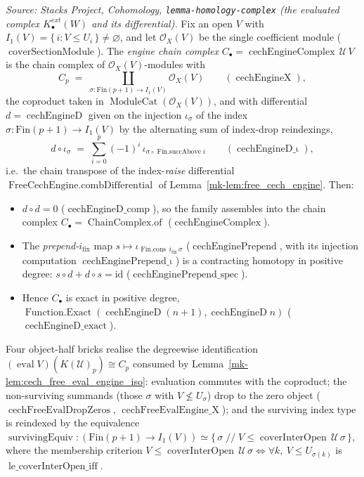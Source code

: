 \begin{lemma}
  \textit{Source: Stacks Project, Cohomology, \texttt{lemma-homology-complex}
  (the evaluated complex \(K^{ext}_\bullet(W)\) and its differential).}
  Fix an open \(V\) with \(I_1(V) = \{\, i : V \leq U_i \,\} \neq \varnothing\), and
  let \(\mathcal{O}_X(V)\) be the single coefficient module
  (\(\operatorname{coverSectionModule}\)). The \emph{engine chain complex}
  \(C_\bullet = \operatorname{cechEngineComplex}\, \mathcal{U}\, V\) is the chain
  complex of \(\mathcal{O}_X(V)\)-modules with
  \[
    C_p \;=\; \coprod_{\sigma : \mathrm{Fin}(p+1) \to I_1(V)} \mathcal{O}_X(V)
    \qquad (\operatorname{cechEngineX}),
  \]
  the coproduct taken in \(\operatorname{ModuleCat}(\mathcal{O}_X(V))\), and with
  differential \(d = \operatorname{cechEngineD}\) given on the injection
  \(\iota_\sigma\) of the index \(\sigma : \mathrm{Fin}(p+1) \to I_1(V)\) by the
  alternating sum of index-drop reindexings,
  \[
    d \circ \iota_\sigma
      \;=\; \sum_{i=0}^{p} (-1)^i\, \iota_{\sigma \circ \operatorname{Fin.succAbove} i}
    \qquad (\operatorname{cechEngineD\_\iota}),
  \]
  i.e.\ the chain transpose of the index-\emph{raise} differential
  \(\operatorname{FreeCechEngine.combDifferential}\) of
  Lemma~\ref{mk-lem:free_cech_engine}. Then:
  \begin{itemize}
    \item \(d \circ d = 0\) (\(\operatorname{cechEngineD\_comp}\)), so the family
      assembles into the chain complex \(C_\bullet = \operatorname{ChainComplex.of}\)
      (\(\operatorname{cechEngineComplex}\)).
    \item The \emph{prepend-\(i_{\mathrm{fix}}\)} map
      \(s \mapsto \iota_{\operatorname{Fin.cons}\, i_{\mathrm{fix}}\, \sigma}\)
      (\(\operatorname{cechEnginePrepend}\), with its injection computation
      \(\operatorname{cechEnginePrepend\_\iota}\)) is a contracting homotopy in
      positive degree: \(s \circ d + d \circ s = \mathrm{id}\)
      (\(\operatorname{cechEnginePrepend\_spec}\)).
    \item Hence \(C_\bullet\) is exact in positive degree,
      \(\operatorname{Function.Exact}(\operatorname{cechEngineD}(n+1),
      \operatorname{cechEngineD} n)\) (\(\operatorname{cechEngineD\_exact}\)).
  \end{itemize}
  Four object-half bricks realise the degreewise identification
  \((\operatorname{eval} V)(K(\mathcal{U})_p) \cong C_p\) consumed by
  Lemma~\ref{mk-lem:cech_free_eval_engine_iso}: evaluation commutes with the coproduct;
  the non-surviving summands (those \(\sigma\) with \(V \not\leq U_\sigma\)) drop to the
  zero object (\(\operatorname{cechFreeEvalDropZeros}\),
  \(\operatorname{cechFreeEvalEngine\_X}\)); and the surviving index type is reindexed
  by the equivalence
  \(\operatorname{survivingEquiv} : (\mathrm{Fin}(p+1) \to I_1(V)) \simeq
  \{\, \sigma \;//\; V \leq \operatorname{coverInterOpen}\, \mathcal{U}\, \sigma \,\}\),
  where the membership criterion
  \(V \leq \operatorname{coverInterOpen}\, \mathcal{U}\, \sigma
  \iff \forall k,\ V \leq U_{\sigma(k)}\) is
  \(\operatorname{le\_coverInterOpen\_iff}\).


\end{lemma}
